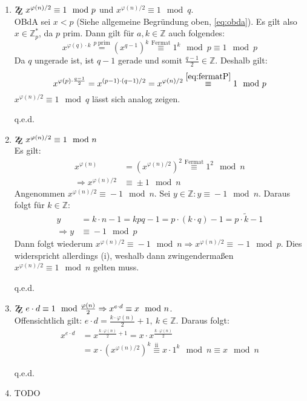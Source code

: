\documentclass[DIN, pagenumber=false, fontsize=11pt, parskip=half]{scrartcl}
\newcommand{\Z}[0]{\mathbb{Z}}
\newcommand{\ZZ}{\mathrm{Z\kern-.3em\raise-0.5ex\hbox{Z}}}
\newcommand{\congTo}[3][]{\stackrel{#1}{\equiv} #2\mod #3}
\newcommand{\Qed}{\begin{flushright}
    q.e.d.
\end{flushright}}
\begin{document}
    \begin{enumerate}[label=(\roman*)]
        \item $\ZZ \ x^{\varphi(n)/2} \congTo{1}{p}$ und $x^{\varphi(n)/2} \congTo{1}{q}$. \\
              OBdA sei $x < p$ (Siehe allgemeine Begründung oben, \cref{eq:obda}). Es gilt also $x \in \Z_p^*$, da $p$ prim. Dann gilt für $a, k \in \Z$
              auch folgendes:
              \begin{equation}
                  x^{\varphi(q) \cdot k} \stackrel{p \ \text{prim}}{=} \left(x^{q - 1}\right)^k \congTo[\text{Fermat}]{1^k}{p} \congTo{1}{p}
                  \label{eq:fermatP}
              \end{equation}
              Da $q$ ungerade ist, ist $q - 1$ gerade und somit $\frac{q - 1}{2} \in \Z$. Deshalb gilt:
              \begin{equation}
                  x^{\varphi(p) \cdot \frac{q - 1}{2}} = x^{(p - 1) \cdot (q - 1) / 2} = x^{\varphi(n) / 2} \congTo[\ref{eq:fermatP}]{1}{p}
              \end{equation}
              $x^{\varphi(n)/2} \congTo{1}{q}$ lässt sich analog zeigen. \Qed
        \item $\ZZ \ x^{\varphi(n)/2} \congTo{1}{n}$ \\
              Es gilt:
              \begin{align}
                  x^{\varphi(n)} &= \left(x^{\varphi(n)/2}\right)^2 \congTo[\text{Fermat}]{1^2}{n} \\
                  \Rightarrow x^{\varphi(n)/2} &\congTo{\pm 1}{n}
              \end{align}
              Angenommen $x^{\varphi(n)/2} \congTo{-1}{n}$. Sei $y \in \Z : y \congTo{-1}{n}$. Daraus folgt für $k \in \Z$:
              \begin{align}
                  y &= k \cdot n - 1 = k p q - 1 = p \cdot (k \cdot q) - 1 = p \cdot \tilde{k} -1 \\
                  \Rightarrow y &\congTo{-1}{p} \label{eq:mOneInP}
              \end{align}
              Dann folgt wiederum $x^{\varphi(n)/2} \congTo{- 1}{n} \Rightarrow x^{\varphi(n)/2} \congTo{- 1}{p}$. Dies widerspricht allerdings (i), 
              weshalb dann zwingendermaßen $x^{\varphi(n)/2} \congTo{1}{n}$ gelten muss. \Qed
        \item $\ZZ \ e \cdot d \congTo{1}{\frac{\varphi(n)}{2}} \Rightarrow x^{e \cdot d} \congTo{x}{n}$. \\
              Offensichtlich gilt: $e \cdot d = \frac{k \cdot \varphi(n)}{2} + 1, \ k \in \Z$. Daraus folgt:
              \begin{align}
                  x^{e \cdot d} &= x^{\frac{k \cdot \varphi(n)}{2} + 1} = x \cdot x^{\frac{k \cdot \varphi(n)}{2}} \\
                   &= x \cdot \left(x^{\varphi(n)/2}\right)^k \congTo[\text{ii}]{x \cdot 1^k}{n} \congTo{x}{n}
              \end{align}
              \Qed
        \item TODO
    \end{enumerate}
\end{document}
